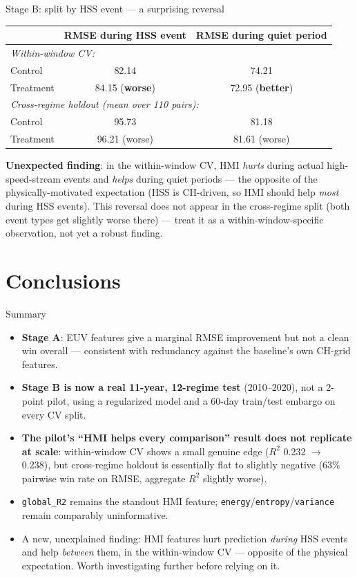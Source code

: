 \documentclass[11pt]{beamer}
\begin{document}
\begin{frame}{Stage B: split by HSS event --- a surprising reversal}
\begin{table}
\centering
\small
\begin{tabular}{lcc}
\toprule
& RMSE during HSS event & RMSE during quiet period \\
\midrule
\multicolumn{3}{l}{\textit{Within-window CV:}} \\
Control & 82.14 & 74.21 \\
Treatment & 84.15 (\textbf{worse}) & 72.95 (\textbf{better}) \\
\midrule
\multicolumn{3}{l}{\textit{Cross-regime holdout (mean over 110 pairs):}} \\
Control & 95.73 & 81.18 \\
Treatment & 96.21 (worse) & 81.61 (worse) \\
\bottomrule
\end{tabular}
\end{table}
\textbf{Unexpected finding}: in the within-window CV, HMI \emph{hurts} during actual high-speed-stream events and \emph{helps} during quiet periods --- the opposite of the physically-motivated expectation (HSS is CH-driven, so HMI should help \emph{most} during HSS events). This reversal does not appear in the cross-regime split (both event types get slightly worse there) --- treat it as a within-window-specific observation, not yet a robust finding.
\end{frame}

\section{Conclusions}

\begin{frame}{Summary}
\begin{itemize}
  \item \textbf{Stage A}: EUV features give a marginal RMSE improvement but not a clean win overall --- consistent with redundancy against the baseline's own CH-grid features.
  \item \textbf{Stage B is now a real 11-year, 12-regime test} (2010--2020), not a 2-point pilot, using a regularized model and a 60-day train/test embargo on every CV split.
  \item \textbf{The pilot's ``HMI helps every comparison'' result does not replicate at scale}: within-window CV shows a small genuine edge ($R^2$ 0.232 $\to$ 0.238), but cross-regime holdout is essentially flat to slightly negative (63\% pairwise win rate on RMSE, aggregate $R^2$ slightly worse).
  \item \texttt{global\_R2} remains the standout HMI feature; \texttt{energy}/\texttt{entropy}/\texttt{variance} remain comparably uninformative.
  \item A new, unexplained finding: HMI features hurt prediction \emph{during} HSS events and help \emph{between} them, in the within-window CV --- opposite of the physical expectation. Worth investigating further before relying on it.
\end{itemize}
\end{frame}
\end{document}
